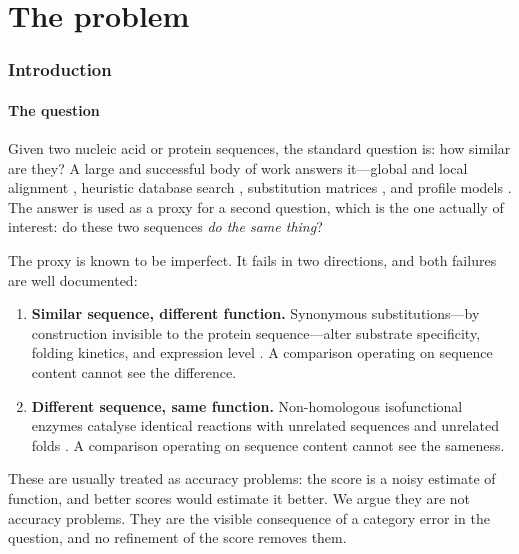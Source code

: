 \documentclass[11pt,twocolumn,a4paper]{article}
\theoremstyle{definition}
\theoremstyle{remark}
\begin{document}
\tableofcontents

\part{The problem}

\section{Introduction}
\label{sec:intro}

\subsection{The question}

Given two nucleic acid or protein sequences, the standard question is: how
similar are they? A large and successful body of work answers it---global
and local alignment \citep{needleman1970,smith1981}, heuristic database
search \citep{altschul1990,altschul1997}, substitution matrices
\citep{henikoff1992}, and profile models \citep{eddy1998}. The answer is
used as a proxy for a second question, which is the one actually of
interest: do these two sequences \emph{do the same thing}?

The proxy is known to be imperfect. It fails in two directions, and both
failures are well documented:

\begin{enumerate}[label=(\roman*),leftmargin=2.2em]
  \item \textbf{Similar sequence, different function.} Synonymous
  substitutions---by construction invisible to the protein sequence---alter
  substrate specificity, folding kinetics, and expression level
  \citep{kimchi2007,sauna2011,plotkin2011}. A comparison operating on
  sequence content cannot see the difference.
  \item \textbf{Different sequence, same function.} Non-homologous
  isofunctional enzymes catalyse identical reactions with unrelated
  sequences and unrelated folds \citep{galperin1998,omelchenko2010,%
  doolittle1994}. A comparison operating on sequence content cannot see
  the sameness.
\end{enumerate}

These are usually treated as accuracy problems: the score is a noisy
estimate of function, and better scores would estimate it better. We
argue they are not accuracy problems. They are the visible consequence of
a category error in the question, and no refinement of the score removes
them.
\end{document}
